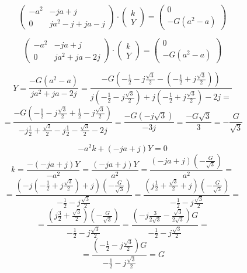 \documentclass{article}
\begin{document}
$$
    \begin{pmatrix}
        -a^2 & - j a + j           \\
        0    & j a^2 - j + j a - j
    \end{pmatrix}
    \cdot
    \begin{pmatrix}
        k \\
        Y
    \end{pmatrix}
    =
    \begin{pmatrix}
        0 \\
        - G (a^2 - a)
    \end{pmatrix}
$$

$$
    \begin{pmatrix}
        -a^2 & - j a + j         \\
        0    & j a^2 + j a - 2 j
    \end{pmatrix}
    \cdot
    \begin{pmatrix}
        k \\
        Y
    \end{pmatrix}
    =
    \begin{pmatrix}
        0 \\
        - G (a^2 - a)
    \end{pmatrix}
$$

$$
    Y = \frac{- G (a^2 - a)}{j a^2 + j a - 2 j} = \frac{
        - G \left( -\frac{1}{2} - j \frac{\sqrt{3}}{2} - \left( -\frac{1}{2} + j \frac{\sqrt{3}}{2} \right) \right)
    }{
        j \left( -\frac{1}{2} - j \frac{\sqrt{3}}{2} \right) + j \left( -\frac{1}{2} + j \frac{\sqrt{3}}{2} \right) - 2 j =
    }
$$
$$
    = \frac{
        - G \left( -\frac{1}{2} - j \frac{\sqrt{3}}{2} + \frac{1}{2} - j \frac{\sqrt{3}}{2} \right)
    }{
        -j \frac{1}{2} + \frac{\sqrt{3}}{2} - j \frac{1}{2} - \frac{\sqrt{3}}{2} - 2 j
    } = \frac{
        - G \left( -j \sqrt{3} \right)
    }{
        -3 j
    } = \frac{- G \sqrt{3}}{3} = -\frac{G}{\sqrt{3}}
$$

$$
    -a^2 k + (-j a + j) Y = 0
$$
$$
    k = \frac{- (-j a + j) Y}{-a^2} = \frac{(-j a + j) Y}{a^2} = \frac{(-j a + j) \left( -\frac{G}{\sqrt{3}} \right)}{a^2} =
$$
$$
    = \frac{
        \left( -j \left( -\frac{1}{2} + j \frac{\sqrt{3}}{2} \right) + j \right) \left( -\frac{G}{\sqrt{3}} \right)
    }{
        -\frac{1}{2} - j \frac{\sqrt{3}}{2}
    } = \frac{
        \left( j \frac{1}{2} + \frac{\sqrt{3}}{2} + j \right) \left( -\frac{G}{\sqrt{3}} \right)
    }{
        -\frac{1}{2} - j \frac{\sqrt{3}}{2}
    } =
$$
$$
    = \frac{
        \left( j \frac{3}{2} + \frac{\sqrt{3}}{2} \right) \left( -\frac{G}{\sqrt{3}} \right)
    }{
        -\frac{1}{2} - j \frac{\sqrt{3}}{2}
    } = \frac{
        \left( - j \frac{3}{2 \sqrt{3}} - \frac{\sqrt{3}}{2 \sqrt{3}} \right) G
    }{
        -\frac{1}{2} - j \frac{\sqrt{3}}{2}
    } =
$$
$$
    = \frac{
        \left( -\frac{1}{2} - j \frac{\sqrt{3}}{2} \right) G
    }{
        -\frac{1}{2} - j \frac{\sqrt{3}}{2}
    } = G
$$
\end{document}
